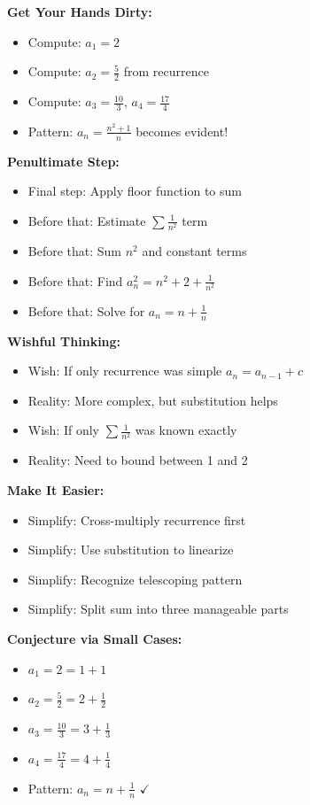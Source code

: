 \documentclass[12pt]{article}
\begin{document}
\begin{strategicbox}
\textbf{Get Your Hands Dirty:}
\begin{itemize}
    \item Compute: $a_1 = 2$
    \item Compute: $a_2 = \frac{5}{2}$ from recurrence
    \item Compute: $a_3 = \frac{10}{3}$, $a_4 = \frac{17}{4}$
    \item Pattern: $a_n = \frac{n^2+1}{n}$ becomes evident!
\end{itemize}

\textbf{Penultimate Step:}
\begin{itemize}
    \item Final step: Apply floor function to sum
    \item Before that: Estimate $\sum \frac{1}{n^2}$ term
    \item Before that: Sum $n^2$ and constant terms
    \item Before that: Find $a_n^2 = n^2 + 2 + \frac{1}{n^2}$
    \item Before that: Solve for $a_n = n + \frac{1}{n}$
\end{itemize}

\textbf{Wishful Thinking:}
\begin{itemize}
    \item Wish: If only recurrence was simple $a_n = a_{n-1} + c$
    \item Reality: More complex, but substitution helps
    \item Wish: If only $\sum \frac{1}{n^2}$ was known exactly
    \item Reality: Need to bound between 1 and 2
\end{itemize}

\textbf{Make It Easier:}
\begin{itemize}
    \item Simplify: Cross-multiply recurrence first
    \item Simplify: Use substitution to linearize
    \item Simplify: Recognize telescoping pattern
    \item Simplify: Split sum into three manageable parts
\end{itemize}

\textbf{Conjecture via Small Cases:}
\begin{itemize}
    \item $a_1 = 2 = 1 + 1$
    \item $a_2 = \frac{5}{2} = 2 + \frac{1}{2}$
    \item $a_3 = \frac{10}{3} = 3 + \frac{1}{3}$
    \item $a_4 = \frac{17}{4} = 4 + \frac{1}{4}$
    \item Pattern: $a_n = n + \frac{1}{n}$ $\checkmark$
\end{itemize}


\end{strategicbox}
\end{document}
